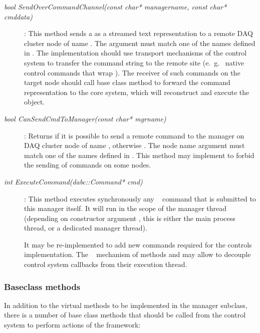 \begin{description}
\item[\em bool SendOverCommandChannel(const char* managername, const char* cmddata)] :
This method sends a  as a streamed text representation 
to a remote DAQ cluster node of name .
The  argument must match one of the names defined in
. The implementation should use
transport mechanisms of the control system to transfer the
command string to the remote site 
(e.~g.~ native control commands that wrap ).
The receiver of such commands on the target node
should call base class method
 to 
forward the command representation to the core system,
which will reconstruct and execute the  object. 

 
\item[\em bool CanSendCmdToManager(const char* mgrname)] :
Returns  if it is possible to send a remote
command to the manager on DAQ cluster node of name ,
otherwise . 
The node name argument must match one of the names defined in
.
This method may implement to forbid the sending of commands on some nodes.


\item[\em int ExecuteCommand(dabc::Command* cmd)] :
This method executes synchronously any
\dabc~ command that is submitted to this manager itself.
It will run in the scope of the manager thread
(depending on constructor argument , 
this is either the main process thread, or a dedicated manager thread).

It may be re-implemented to add new commands required for the
controls implementation. The \dabc~ mechanism of
methods  and  may allow
to decouple control system callbacks from their execution thread.

 
\end{description}


\subsubsection{Baseclass methods}
\label{prog_manager_controls_base}
In addition to the virtual methods to be implemented in the manager subclass,
there is a number of  base class methods 
that should be called from the control system to perform actions of the 
framework:

